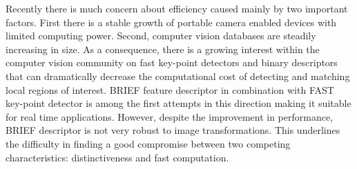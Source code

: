 \documentclass[letterpaper, 10pt, conference]{ieeeconf}
\begin{document}
Recently there is much concern about efficiency caused mainly by two important factors. First there is a stable growth of portable camera enabled devices with limited computing power. Second, computer vision databases are steadily increasing in size. As a consequence, there is a growing interest within the computer vision community on fast key-point detectors and binary descriptors that can dramatically decrease the computational cost of detecting and matching local regions of interest. BRIEF \cite{calonder10} feature descriptor in combination with FAST \cite{rosten06} key-point detector is among the first attempts in this direction making it suitable for real time applications. However, despite the improvement in performance, BRIEF descriptor is not very robust to image transformations. This underlines the difficulty in finding a good compromise between two competing characteristics: distinctiveness and fast computation. 
\end{document}
